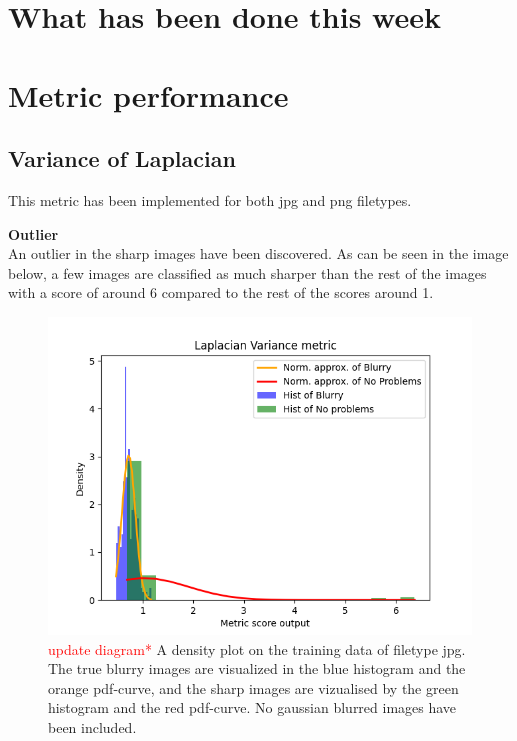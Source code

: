 \section*{What has been done this week}


\newpage
\section{Metric performance}


\subsection{Variance of Laplacian}
This metric has been implemented for both jpg and png filetypes.

\textbf{Outlier}\\
An outlier in the sharp images have been discovered. As can be seen in the image below, a few images are classified as much sharper than the rest of the images with a score of around 6 compared to the rest of the scores around 1.
\begin{figure}[H]
	\centering
    \includegraphics[width=.8\textwidth]{Figures/lv/output_dens_lv_jpg_old.png}
    \caption{\textcolor{red}{update diagram* }A density plot on the training data of filetype jpg. The true blurry images are visualized in the blue histogram and the orange pdf-curve, and the sharp images are vizualised by the green histogram and the red pdf-curve. No gaussian blurred images have been included.}
    \label{fig:LV_dens_jpg_old}
\end{figure}

